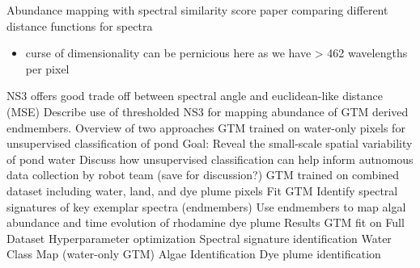 \documentclass{article}
\begin{document}
\begin{outline}[enumerate]
        \3 Abundance mapping with spectral similarity score
            \4 paper comparing different distance functions for spectra
                \begin{itemize}
                    \item curse of dimensionality can be pernicious here as we have > 462 wavelengths per pixel
                \end{itemize}
            \4 NS3 offers good trade off between spectral angle and euclidean-like distance (MSE)
        \3 Describe use of thresholded NS3 for mapping abundance of GTM derived endmembers.
    \2 Overview of two approaches
        \3 GTM trained on water-only pixels for unsupervised classification of pond
            \4 Goal: Reveal the small-scale spatial variability of pond water
            \4 Discuss how unsupervised classification can help inform autnomous data collection by robot team (save for discussion?)
        \3 GTM trained on combined dataset including water, land, and dye plume pixels
            \4 Fit GTM
            \4 Identify spectral signatures of key exemplar spectra (endmembers)
            \4 Use endmembers to map algal abundance and time evolution of rhodamine dye plume
\1 Results
    \2  GTM fit on Full Dataset
    \2 Hyperparameter optimization
    \2 Spectral signature identification
    \2 Water Class Map (water-only GTM)
    \2 Algae Identification
    \2 Dye plume identification


\end{outline}
\end{document}
